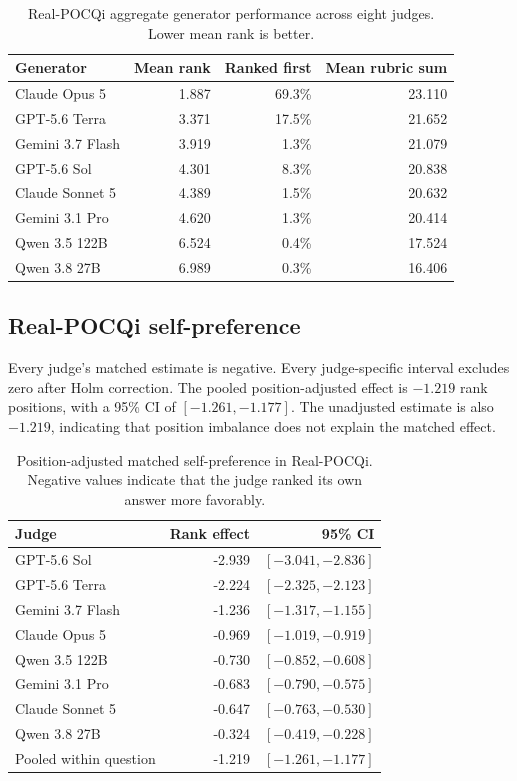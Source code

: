 \documentclass[11pt]{article}
\begin{document}
\begin{table}[htbp]
\centering
\small
\caption{Real-POCQi aggregate generator performance across eight
judges. Lower mean rank is better.}
\label{tab:real-performance}
\begin{tabular}{lrrr}
\toprule
Generator & Mean rank & Ranked first & Mean rubric sum \\
\midrule
Claude Opus 5 & 1.887 & 69.3\% & 23.110 \\
GPT-5.6 Terra & 3.371 & 17.5\% & 21.652 \\
Gemini 3.7 Flash & 3.919 & 1.3\% & 21.079 \\
GPT-5.6 Sol & 4.301 & 8.3\% & 20.838 \\
Claude Sonnet 5 & 4.389 & 1.5\% & 20.632 \\
Gemini 3.1 Pro & 4.620 & 1.3\% & 20.414 \\
Qwen 3.5 122B & 6.524 & 0.4\% & 17.524 \\
Qwen 3.8 27B & 6.989 & 0.3\% & 16.406 \\
\bottomrule
\end{tabular}
\end{table}
\FloatBarrier

\subsection{Real-POCQi self-preference}

Every judge's matched estimate is negative. Every judge-specific interval
excludes zero after Holm correction. The pooled position-adjusted effect is
$-1.219$ rank positions, with a 95\% CI of $[-1.261,-1.177]$. The unadjusted
estimate is also $-1.219$, indicating that position imbalance does not explain
the matched effect.

\begin{table}[htbp]
\centering
\small
\caption{Position-adjusted matched self-preference in Real-POCQi. Negative
values indicate that the judge ranked its own answer more favorably.}
\label{tab:real-self}
\begin{tabular}{lrr}
\toprule
Judge & Rank effect & 95\% CI \\
\midrule
GPT-5.6 Sol & -2.939 & $[-3.041,-2.836]$ \\
GPT-5.6 Terra & -2.224 & $[-2.325,-2.123]$ \\
Gemini 3.7 Flash & -1.236 & $[-1.317,-1.155]$ \\
Claude Opus 5 & -0.969 & $[-1.019,-0.919]$ \\
Qwen 3.5 122B & -0.730 & $[-0.852,-0.608]$ \\
Gemini 3.1 Pro & -0.683 & $[-0.790,-0.575]$ \\
Claude Sonnet 5 & -0.647 & $[-0.763,-0.530]$ \\
Qwen 3.8 27B & -0.324 & $[-0.419,-0.228]$ \\
\midrule
Pooled within question & -1.219 & $[-1.261,-1.177]$ \\
\bottomrule
\end{tabular}
\end{table}
\FloatBarrier
\end{document}
